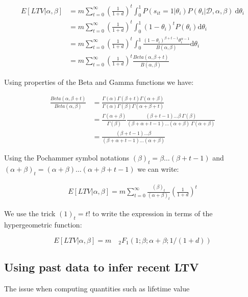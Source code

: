 \documentclass{tufte-book}
\begin{document}
\begin{align*}
  E\left[LTV|\alpha, \beta\right] &= m \sum_{t=0}^\infty \left(\frac{1}{1+d}\right)^t \int_0^1 P(s_{it}=1 | \theta_i)
  P(\theta_i|\mathcal{D}, \alpha, \beta)
  \: \mathrm{d} \theta_i\\
  & = m \sum_{t=0}^\infty \left(\frac{1}{1+d}\right)^t \int_0^1 \left(1-\theta_i\right)^t P(\theta_i)
  \mathrm{d}\theta_i\\
  & = m \sum_{t=0}^\infty \left(\frac{1}{1+d}\right)^t \int_0^1 \frac{\left(1-\theta_i\right)^{\beta+t-1}
  \theta_i^{\alpha-1} }{B(\alpha, \beta)}\mathrm{d}\theta_i\\
  & = m \sum_{t=0}^\infty \left(\frac{1}{1+d}\right)^t \frac{Beta(\alpha, \beta+t) }{B(\alpha, \beta)}
\end{align*}

Using properties of the Beta and Gamma functions we have:

\begin{align*}
  \frac{Beta(\alpha, \beta+t)}{Beta(\alpha, \beta)} &=
  \frac{\Gamma(\alpha)\Gamma(\beta+t)\Gamma(\alpha+\beta)}{\Gamma(\alpha)\Gamma(\beta)\Gamma(\alpha+\beta+t)}\\
  &= \frac{\Gamma(\alpha+\beta)}{\Gamma(\beta)}
  \frac{(\beta+t-1)\dots\beta\:\Gamma(\beta)}{(\beta+\alpha+t-1)\dots(\alpha+\beta)\:\Gamma(\alpha+\beta)}\\
  &= \frac{(\beta+t-1)\dots\beta}{(\beta+\alpha+t-1)\dots(\alpha+\beta)}
\end{align*}

Using the Pochammer symbol notations $(\beta)_t = \beta \dots (\beta+t-1)$ and $(\alpha+\beta)_t =
(\alpha+\beta) \dots (
\alpha+\beta+t-1)$ we can write:

\begin{align*}
  E\left[LTV|\alpha, \beta\right] = m \sum_{t=0}^{\infty} \frac{(\beta)_t}{\left(\alpha+\beta\right)_t}
  \left(\frac{1}{1+d}\right)^t
\end{align*}

We use the trick $(1)_t = t!$ to write the expression in terms of the hypergeometric function:

$$
E\left[LTV | \alpha, \beta\right] = m \quad _2F_1(1; \beta; \alpha+\beta; 1/(1+d))
$$

\subsection{Using past data to infer recent LTV}

The issue when computing quantities such as lifetime value
  
\end{document}
